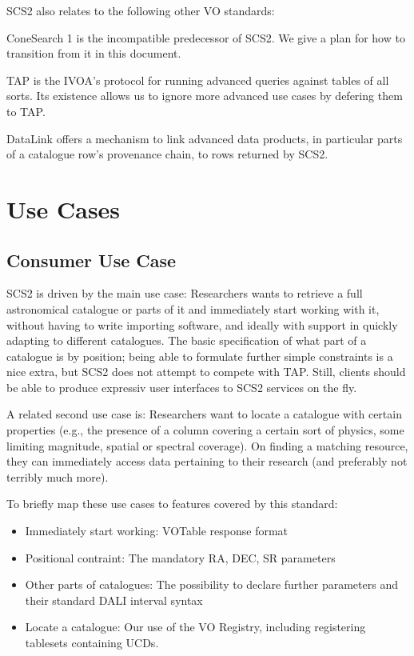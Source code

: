 \documentclass[11pt,a4paper]{ivoa}
\begin{document}
SCS2 also relates to the following other VO standards:

\begin{bigdescription}
 \item[ConeSearch 1] \citet{2008ivoa.specQ0222P} is the incompatible
predecessor of SCS2.  We give a plan for how to transition from it in
this document.

\item[TAP] \citet{2019ivoa.spec.0927D} is the IVOA's protocol for
running advanced queries against tables of all sorts.  Its existence
allows us to ignore more advanced use cases by defering them to TAP.

\item[DataLink] \citet{2023ivoa.spec.1215B} offers a mechanism to link
advanced data products, in particular parts of a catalogue row's
provenance chain, to rows returned by SCS2.
\end{bigdescription}

\section{Use Cases}

\subsection{Consumer Use Case}

SCS2 is driven by the main use case: Researchers wants to retrieve a
full astronomical catalogue or parts of it and immediately start working
with it, without having to write importing software, and ideally with
support in quickly adapting to different catalogues.  The basic
specification of what part of a catalogue is by position; being able to
formulate further simple constraints is a nice extra, but SCS2 does not
attempt to compete with TAP.  Still, clients should be able to produce
expressiv user interfaces to SCS2 services on the fly.

A related second use case is: Researchers want to locate a catalogue
with certain properties (e.g., the presence of a column covering a
certain sort of physics, some limiting magnitude, spatial or spectral
coverage).  On finding a matching resource, they can immediately access
data pertaining to their research (and preferably not terribly much
more).

To briefly map these use cases to features covered by this standard:

\begin{itemize}
\item Immediately start working: VOTable response format
\item Positional contraint: The mandatory RA, DEC, SR parameters
\item Other parts of catalogues: The possibility to declare further
parameters and their standard DALI interval syntax
\item Locate a catalogue: Our use of the VO Registry, including
registering tablesets containing UCDs.
\end{itemize}
\end{document}
